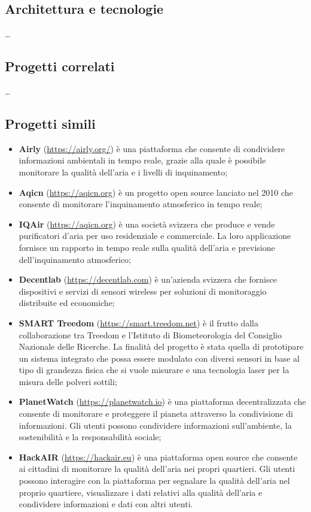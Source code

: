 \subsection{Architettura e tecnologie}\label{ssec:airqino-architettura}
\ldots

\subsection{Progetti correlati}\label{ssec:correlati}
\ldots

\subsection{Progetti simili}\label{ssec:competitor}

\begin{itemize}
	\item \textbf{Airly} (\url{https://airly.org/}) è una piattaforma che consente di condividere informazioni ambientali in tempo reale, grazie alla quale è possibile monitorare la qualità dell'aria e i livelli di inquinamento;
	\item \textbf{Aqicn} (\url{https://aqicn.org}) è un progetto open source lanciato nel 2010 che consente di monitorare l'inquinamento atmosferico in tempo reale;
	\item \textbf{IQAir} (\url{https://aqicn.org}) è una società svizzera che produce e vende purificatori d'aria per uso residenziale e commerciale. La loro applicazione fornisce un rapporto in tempo reale sulla qualità dell'aria e previsione dell'inquinamento atmosferico;
	\item \textbf{Decentlab} (\url{https://decentlab.com}) è un'azienda svizzera che fornisce dispositivi e servizi di sensori wireless per soluzioni di monitoraggio distribuite ed economiche;
	\item \textbf{SMART Treedom} (\url{https://smart.treedom.net}) è il frutto dalla collaborazione tra Treedom e l’Istituto di Biometeorologia del Consiglio Nazionale delle Ricerche. La finalità del progetto è stata quella di prototipare un sistema integrato che possa essere modulato con diversi sensori in base al tipo di grandezza fisica che si vuole misurare e una tecnologia laser per la misura delle polveri sottili;
	\item \textbf{PlanetWatch} (\url{https://planetwatch.io}) è una piattaforma decentralizzata che consente di monitorare e proteggere il pianeta attraverso la condivisione di informazioni. Gli utenti possono condividere informazioni sull'ambiente, la sostenibilità e la responsabilità sociale;
	\item \textbf{HackAIR} (\url{https://hackair.eu}) è una piattaforma open source che consente ai cittadini di monitorare la qualità dell'aria nei propri quartieri. Gli utenti possono interagire con la piattaforma per segnalare la qualità dell'aria nel proprio quartiere, visualizzare i dati relativi alla qualità dell'aria e condividere informazioni e dati con altri utenti.
\end{itemize}
